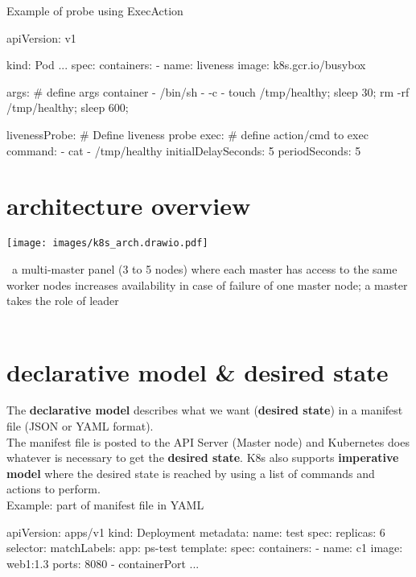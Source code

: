 \documentclass{refcard}
\begin{document}
Example of probe using ExecAction

\begin{yamlbox}[title={ExecAction example}]
apiVersion: v1

kind: Pod
...
spec:
  containers:
  - name: liveness
    image: k8s.gcr.io/busybox
    
    args: # define args container
    - /bin/sh
    - -c
    - touch /tmp/healthy; sleep 30;
      rm -rf /tmp/healthy; sleep 600;
      
    livenessProbe: # Define liveness probe
      exec: # define action/cmd to exec
        command:
        - cat
        - /tmp/healthy
      initialDelaySeconds: 5
      periodSeconds: 5
\end{yamlbox}


\section{architecture overview}

\begin{center}
    \texttt{[image: images/k8s\_arch.drawio.pdf]}
\end{center}
\textbullet\ a multi-master panel (3 to 5 nodes) where each master has access to the same worker nodes increases availability in case of failure of one master node; a master takes the role of leader \\
\textbullet\ 

\section{declarative model \& desired state}

The \textbf{declarative model} describes what we want (\textbf{desired state}) in a manifest file (JSON or YAML format).\\

The manifest file is posted to the API Server (Master node) and Kubernetes does whatever is necessary to get the \textbf{desired state}. K8s also supports \textbf{imperative model} where the desired state is reached by using a list of commands and actions to perform.\\

Example: part of manifest file in YAML
\begin{yamlbox}[title={Example: part of manifest file in YAML}]
apiVersion: apps/v1
kind: Deployment
metadata:
    name: test
spec:
    replicas: 6
    selector:
        matchLabels:
            app: ps-test
    template:
        spec:
            containers:
                - name: c1
                  image: web1:1.3
                  ports: 8080
                  - containerPort
                    ...
\end{yamlbox}
\end{document}
